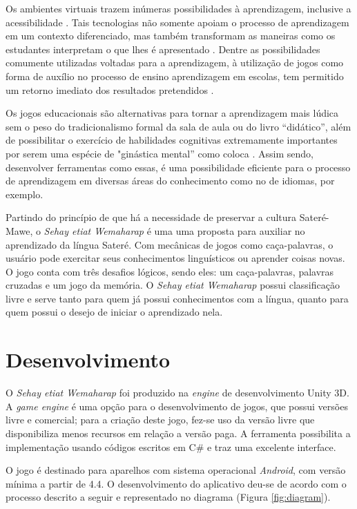 \documentclass[12pt]{article}
\begin{document}
		Os ambientes virtuais trazem inúmeras possibilidades à aprendizagem, inclusive a acessibilidade \cite{kozma2003}. Tais tecnologias não somente apoiam o processo de aprendizagem em um contexto diferenciado, mas também transformam as maneiras como os estudantes interpretam o que lhes é apresentado \cite{saljo2010digital}.  Dentre as possibilidades comumente utilizadas voltadas para a aprendizagem, à utilização de jogos como forma de auxílio no processo de ensino aprendizagem em escolas, tem permitido um retorno imediato dos resultados pretendidos \cite{yamato2017amargana}. 
		
		Os jogos educacionais são alternativas para tornar a aprendizagem mais lúdica sem o peso do tradicionalismo formal da sala de aula ou do livro “didático”, além de possibilitar o exercício de habilidades cognitivas extremamente importantes por serem uma espécie de "ginástica mental” como coloca \cite{tarouco2004jogos}. Assim sendo, desenvolver ferramentas como essas, é uma possibilidade eficiente para o processo de aprendizagem em diversas áreas do conhecimento como no de idiomas, por exemplo.
		
		Partindo do princípio de que há a necessidade de preservar a cultura Sateré-Mawe, o \textit{Sehay etiat Wemaharap} é uma uma proposta para auxiliar no aprendizado da língua Sateré. Com mecânicas de jogos como caça-palavras, o usuário pode exercitar seus conhecimentos linguísticos ou aprender coisas novas. O jogo conta com três desafios lógicos, sendo eles: um caça-palavras, palavras cruzadas e um jogo da memória. O \textit{Sehay etiat Wemaharap} possui classificação livre e serve tanto para quem já possui conhecimentos com a língua, quanto para quem possui o desejo de iniciar o aprendizado nela.

	\section{Desenvolvimento} \label{sec:firstpage}
		O \textit{Sehay etiat Wemaharap} foi produzido na \textit{engine} de desenvolvimento Unity 3D. A \textit{game engine} é uma opção para o desenvolvimento de jogos, que possui versões livre e comercial; para a criação deste jogo, fez-se uso da versão livre que disponibiliza menos recursos em relação a versão paga. A ferramenta possibilita a implementação usando códigos escritos em C\# e traz uma excelente interface.
		
		O jogo é destinado para aparelhos com sistema operacional \textit{Android}, com versão mínima a partir de 4.4. O desenvolvimento do aplicativo deu-se de acordo com o processo descrito a seguir e representado no diagrama (Figura \ref{fig:diagram}).
		
\end{document}
